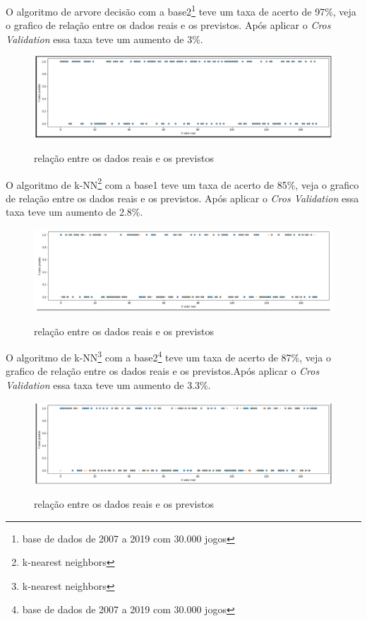 O algoritmo de arvore decisão com a base2\footnote[5]{base de dados de 2007 a 2019 com 30.000 jogos} teve um taxa de acerto de 97\%, veja o grafico de relação entre os dados reais e os previstos. Após aplicar o \textit{Cros Validation} essa taxa teve um  aumento de 3\%.
\begin{figure}[htbp]
	\begin{center}
		\includegraphics[width=0.7\linewidth]{imagens/arvoredecisaoAPI.png}\\
	\end{center}
	\caption[relação entre os dados reais e os previstos]{relação entre os dados reais e os previstos}
	\label{fig:logo}
\end{figure}

O algoritmo de k-NN\footnote[3]{k-nearest neighbors} com a base1 teve um taxa de acerto de 85\%, veja o grafico de relação entre os dados reais e os previstos. Após aplicar o \textit{Cros Validation} essa taxa teve um aumento de 2.8\%.
\begin{figure}[htbp]
	\begin{center}
		\includegraphics[width=0.7\linewidth]{imagens/knn.png}\\
	\end{center}
	\caption[relação entre os dados reais e os previstos]{relação entre os dados reais e os previstos}
	\label{fig:logo}
\end{figure}

O algoritmo de k-NN\footnote[3]{k-nearest neighbors} com a base2\footnote[5]{base de dados de 2007 a 2019 com 30.000 jogos} teve um taxa de acerto de 87\%, veja o grafico de relação entre os dados reais e os previstos.Após aplicar o \textit{Cros Validation} essa taxa teve um aumento de 3.3\%.
\begin{figure}[htbp]
	\begin{center}
		\includegraphics[width=0.7\linewidth]{imagens/knnAPI.png}\\
	\end{center}
	\caption[relação entre os dados reais e os previstos]{relação entre os dados reais e os previstos}
	\label{fig:logo}
\end{figure}

